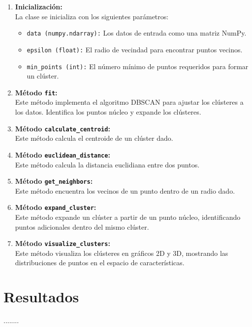 \documentclass[conference]{IEEEtran}
\begin{document}
\begin{enumerate}
  \item \textbf{Inicialización:} \\
  La clase se inicializa con los siguientes parámetros:
  \begin{itemize}
    \item \texttt{data (numpy.ndarray):} Los datos de entrada como una matriz NumPy.
    \item \texttt{epsilon (float):} El radio de vecindad para encontrar puntos vecinos.
    \item \texttt{min\_points (int):} El número mínimo de puntos requeridos para formar un clúster.
  \end{itemize}

  \item \textbf{Método \texttt{fit}:} \\
  Este método implementa el algoritmo DBSCAN para ajustar los clústeres a los datos. Identifica los puntos núcleo y expande los clústeres.

  \item \textbf{Método \texttt{calculate\_centroid}:} \\
  Este método calcula el centroide de un clúster dado.

  \item \textbf{Método \texttt{euclidean\_distance}:} \\
  Este método calcula la distancia euclidiana entre dos puntos.

  \item \textbf{Método \texttt{get\_neighbors}:} \\
  Este método encuentra los vecinos de un punto dentro de un radio dado.

  \item \textbf{Método \texttt{expand\_cluster}:} \\
  Este método expande un clúster a partir de un punto núcleo, identificando puntos adicionales dentro del mismo clúster.

  \item \textbf{Método \texttt{visualize\_clusters}:} \\
  Este método visualiza los clústeres en gráficos 2D y 3D, mostrando las distribuciones de puntos en el espacio de características.

\end{enumerate}



\section{Resultados}
........
\end{document}
